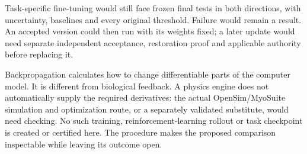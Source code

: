 Task-specific fine-tuning would still face frozen final tests in both
directions, with uncertainty, baselines and every original threshold.
Failure would remain a result. An accepted version could then run with its
weights fixed; a later update would need separate independent acceptance,
restoration proof and applicable authority before replacing it.

Backpropagation calculates how to change differentiable parts of the
computer model. It is different from biological feedback. A physics engine
does not automatically supply the required derivatives: the actual
OpenSim/MyoSuite simulation and optimization route, or a separately validated
substitute, would need checking. No such training, reinforcement-learning
rollout or task checkpoint is created or certified here. The procedure makes
the proposed comparison inspectable while leaving its outcome open.
